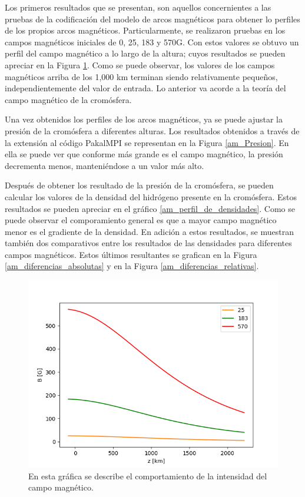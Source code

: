 \documentclass[9pt]{book}
\begin{document}
Los primeros resultados que se presentan, son aquellos concernientes a las pruebas de la codificaci\'on del modelo de arcos magn\'eticos para obtener lo perfiles de los propios arcos magn\'eticos. Particularmente, se realizaron pruebas en los campos magn\'eticos iniciales de 0, 25, 183 y 570G. Con estos valores se obtuvo un perfil del campo magn\'etico a lo largo de la altura; cuyos resultados se pueden apreciar en la Figura \ref{am_Campo_Magnetico}. Como se puede observar, los valores de los campos magn\'eticos arriba de los 1,000 km terminan siendo relativamente peque\~nos, independientemente del valor de entrada. Lo anterior va acorde a la teor\'ia del campo magn\'etico de la crom\'osfera.

Una vez obtenidos los perfiles de los arcos magn\'eticos, ya se puede ajustar la presi\'on de la crom\'osfera a diferentes alturas. Los resultados obtenidos a trav\'es de la extensi\'on al c\'odigo PakalMPI se representan en la Figura \ref{am_Presion}. En ella se puede ver que conforme m\'as grande es el campo magn\'etico, la presi\'on decrementa menos, manteni\'endose a un valor m\'as alto. 

Despu\'es de obtener los resultado de la presi\'on de la crom\'osfera, se pueden calcular los valores de la densidad del hidr\'ogeno presente en la crom\'osfera. Estos resultados se pueden apreciar en el gr\'afico \ref{am_perfil_de_densidades}. Como se puede observar el comporamiento general es que a mayor campo magn\'etico menor es el gradiente de la densidad. En adici\'on a estos resultados, se muestran tambi\'en dos comparativos entre los resultados de las densidades para diferentes campos magn\'eticos. Estos \'ultimos resultantes se grafican en la Figura \ref{am_diferencias_absolutas} y en la Figura \ref{am_diferencias_relativas}.

\newpage
\begin{figure}[h]
\centering
\includegraphics[scale=1]{am_Campo_Magnetico}
\caption{ En esta gr\'afica se describe el comportamiento de la intensidad del campo magn\'etico. }
\label{am_Campo_Magnetico}
\end{figure}
\end{document}
